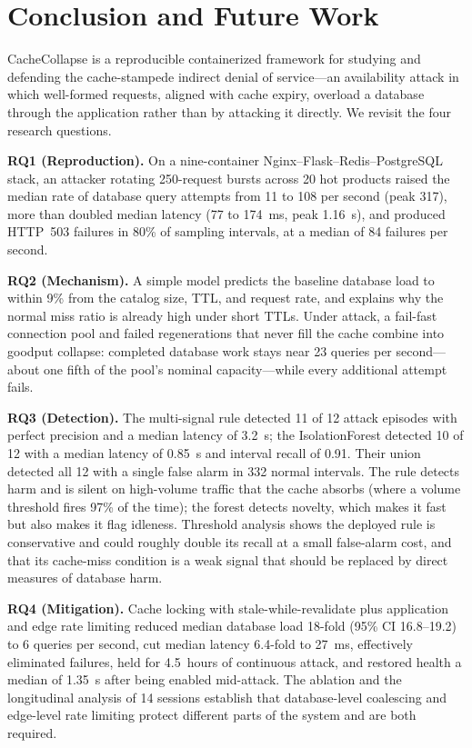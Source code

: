 \section{Conclusion and Future Work}
\label{sec:conclusion}

CacheCollapse is a reproducible containerized framework for studying and defending
the cache-stampede indirect denial of service---an availability attack in which
well-formed requests, aligned with cache expiry, overload a database through the
application rather than by attacking it directly. We revisit the four research
questions.

\textbf{RQ1 (Reproduction).} On a nine-container Nginx--Flask--Redis--PostgreSQL stack,
an attacker rotating 250-request bursts across 20 hot products raised the median rate
of database query attempts from 11 to 108 per second (peak 317), more than doubled
median latency (77 to 174~ms, peak 1.16~s), and produced HTTP~503 failures in 80\% of
sampling intervals, at a median of 84 failures per second.

\textbf{RQ2 (Mechanism).} A simple model predicts the baseline database load to within
9\% from the catalog size, TTL, and request rate, and explains why the normal miss
ratio is already high under short TTLs. Under attack, a fail-fast connection pool and
failed regenerations that never fill the cache combine into goodput collapse:
completed database work stays near 23 queries per second---about one fifth of the
pool's nominal capacity---while every additional attempt fails.

\textbf{RQ3 (Detection).} The multi-signal rule detected 11 of 12 attack episodes with
perfect precision and a median latency of 3.2~s; the IsolationForest detected 10 of 12
with a median latency of 0.85~s and interval recall of 0.91. Their union detected all
12 with a single false alarm in 332 normal intervals. The rule detects harm and is
silent on high-volume traffic that the cache absorbs (where a volume threshold fires
97\% of the time); the forest detects novelty, which makes it fast but also makes it
flag idleness. Threshold analysis shows the deployed rule is conservative and could
roughly double its recall at a small false-alarm cost, and that its cache-miss
condition is a weak signal that should be replaced by direct measures of database
harm.

\textbf{RQ4 (Mitigation).} Cache locking with stale-while-revalidate plus application
and edge rate limiting reduced median database load 18-fold (95\% CI 16.8--19.2) to
6 queries per second, cut median latency 6.4-fold to 27~ms, effectively eliminated
failures, held for 4.5~hours of continuous attack, and restored health a median of
1.35~s after being enabled mid-attack. The ablation and the longitudinal analysis of
14 sessions establish that database-level coalescing and edge-level rate limiting
protect different parts of the system and are both required.

